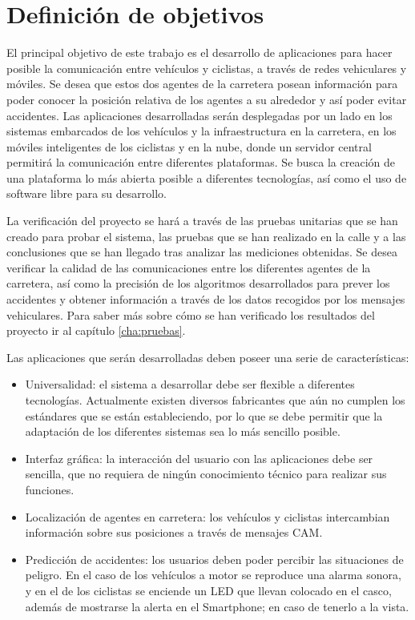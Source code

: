 \chapter{Definición de objetivos}
El principal objetivo de este trabajo es el desarrollo de aplicaciones para hacer posible la comunicación entre vehículos y ciclistas, a través de redes vehiculares y móviles. Se desea que estos dos agentes de la carretera posean información para poder conocer la posición relativa de los agentes a su alrededor y así poder evitar accidentes. Las aplicaciones desarrolladas serán desplegadas por un lado en los sistemas embarcados de los vehículos y la infraestructura en la carretera, en los móviles inteligentes de los ciclistas y en la nube, donde un servidor central permitirá la comunicación entre diferentes plataformas. Se busca la creación de una plataforma lo más abierta posible a diferentes tecnologías, así como el uso de software libre para su desarrollo.

La verificación del proyecto se hará a través de las pruebas unitarias que se han creado para probar el sistema, las pruebas que se han realizado en la calle y a las conclusiones que se han llegado tras analizar las mediciones obtenidas. Se desea verificar la calidad de las comunicaciones entre los diferentes agentes de la carretera, así como la precisión de los algoritmos desarrollados para prever los accidentes y obtener información a través de los datos recogidos por los mensajes vehiculares. Para saber más sobre cómo se han verificado los resultados del proyecto ir al capítulo \ref{cha:pruebas}.

Las aplicaciones que serán desarrolladas deben poseer una serie de características:
\begin{itemize}
	\item Universalidad: el sistema a desarrollar debe ser flexible a diferentes tecnologías. Actualmente existen diversos fabricantes que aún no cumplen los estándares que se están estableciendo, por lo que se debe permitir que la adaptación de los diferentes sistemas sea lo más sencillo posible.

	\item Interfaz gráfica: la interacción del usuario con las aplicaciones debe ser sencilla, que no requiera de ningún conocimiento técnico para realizar sus funciones.

	\item Localización de agentes en carretera: los vehículos y ciclistas intercambian información sobre sus posiciones a través de mensajes CAM.

	\item Predicción de accidentes: los usuarios deben poder percibir las situaciones de peligro. En el caso de los vehículos a motor se reproduce una alarma sonora, y en el de los ciclistas se enciende un LED que llevan colocado en el casco, además de mostrarse la alerta en el Smartphone; en caso de tenerlo a la vista.
\end{itemize}
